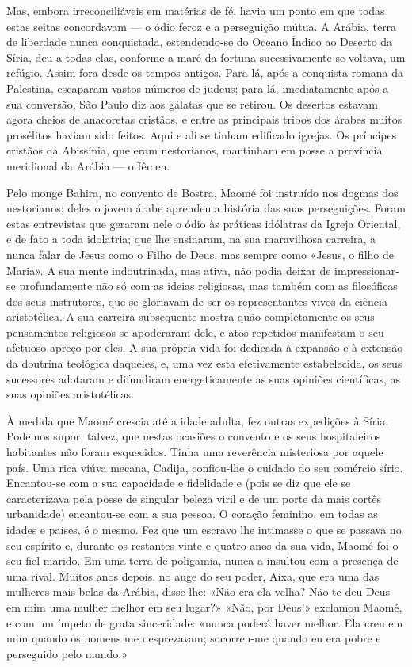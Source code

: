 \documentclass[11pt,a5paper,twoside,openany]{book}
\begin{document}
Mas, embora irreconciliáveis em matérias de fé, havia um ponto em que todas estas seitas concordavam — o ódio feroz e a perseguição mútua. A Arábia, terra de liberdade nunca conquistada, estendendo-se do Oceano Índico ao Deserto da Síria, deu a todas elas, conforme a maré da fortuna sucessivamente se voltava, um refúgio. Assim fora desde os tempos antigos. Para lá, após a conquista romana da Palestina, escaparam vastos números de judeus; para lá, imediatamente após a sua conversão, São Paulo diz aos gálatas que se retirou. Os desertos estavam agora cheios de anacoretas cristãos, e entre as principais tribos dos árabes muitos prosélitos haviam sido feitos. Aqui e ali se tinham edificado igrejas. Os príncipes cristãos da Abissínia, que eram nestorianos, mantinham em posse a província meridional da Arábia — o Iêmen.

Pelo monge Bahira, no convento de Bostra, Maomé foi instruído nos dogmas dos nestorianos; deles o jovem árabe aprendeu a história das suas perseguições. Foram estas entrevistas que geraram nele o ódio às práticas idólatras da Igreja Oriental, e de fato a toda idolatria; que lhe ensinaram, na sua maravilhosa carreira, a nunca falar de Jesus como o Filho de Deus, mas sempre como «Jesus, o filho de Maria». A sua mente indoutrinada, mas ativa, não podia deixar de impressionar-se profundamente não só com as ideias religiosas, mas também com as filosóficas dos seus instrutores, que se gloriavam de ser os representantes vivos da ciência aristotélica. A sua carreira subsequente mostra quão completamente os seus pensamentos religiosos se apoderaram dele, e atos repetidos manifestam o seu afetuoso apreço por eles. A sua própria vida foi dedicada à expansão e à extensão da doutrina teológica daqueles, e, uma vez esta efetivamente estabelecida, os seus sucessores adotaram e difundiram energeticamente as suas opiniões científicas, as suas opiniões aristotélicas.

À medida que Maomé crescia até a idade adulta, fez outras expedições à Síria. Podemos supor, talvez, que nestas ocasiões o convento e os seus hospitaleiros habitantes não foram esquecidos. Tinha uma reverência misteriosa por aquele país. Uma rica viúva mecana, Cadija, confiou-lhe o cuidado do seu comércio sírio. Encantou-se com a sua capacidade e fidelidade e (pois se diz que ele se caracterizava pela posse de singular beleza viril e de um porte da mais cortês urbanidade) encantou-se com a sua pessoa. O coração feminino, em todas as idades e países, é o mesmo. Fez que um escravo lhe intimasse o que se passava no seu espírito e, durante os restantes vinte e quatro anos da sua vida, Maomé foi o seu fiel marido. Em uma terra de poligamia, nunca a insultou com a presença de uma rival. Muitos anos depois, no auge do seu poder, Aixa, que era uma das mulheres mais belas da Arábia, disse-lhe: «Não era ela velha? Não te deu Deus em mim uma mulher melhor em seu lugar?» «Não, por Deus!» exclamou Maomé, e com um ímpeto de grata sinceridade: «nunca poderá haver melhor. Ela creu em mim quando os homens me desprezavam; socorreu-me quando eu era pobre e perseguido pelo mundo.»
\end{document}
